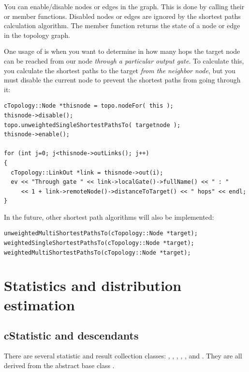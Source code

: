 You can enable/disable nodes or edges in the graph. This is done by
calling their  or  member functions.
Disabled nodes or edges are ignored by the shortest paths calculation
algorithm. The  member function returns the state of
a node or edge in the topology graph.

One usage of  is when you want to determine in how many
hops the target node can be reached from our node \textit{through
a particular output gate}. To calculate this, you calculate the
shortest paths to the target \textit{from the neighbor node}, but
you must disable the current node to prevent the shortest paths
from going through it:

\begin{verbatim}
cTopology::Node *thisnode = topo.nodeFor( this );
thisnode->disable();
topo.unweightedSingleShortestPathsTo( targetnode );
thisnode->enable();

for (int j=0; j<thisnode->outLinks(); j++)
{
  cTopology::LinkOut *link = thisnode->out(i);
  ev << "Through gate " << link->localGate()->fullName() << " : "
     << 1 + link->remoteNode()->distanceToTarget() << " hops" << endl;
}
\end{verbatim}

In the future, other shortest path algorithms will also be implemented:

\begin{verbatim}
unweightedMultiShortestPathsTo(cTopology::Node *target);
weightedSingleShortestPathsTo(cTopology::Node *target);
weightedMultiShortestPathsTo(cTopology::Node *target);
\end{verbatim}






\section{Statistics and distribution estimation}

\subsection{cStatistic and descendants}

There are several statistic and result collection classes:
, , ,
, ,  and
. They are all derived from the abstract base class
.

